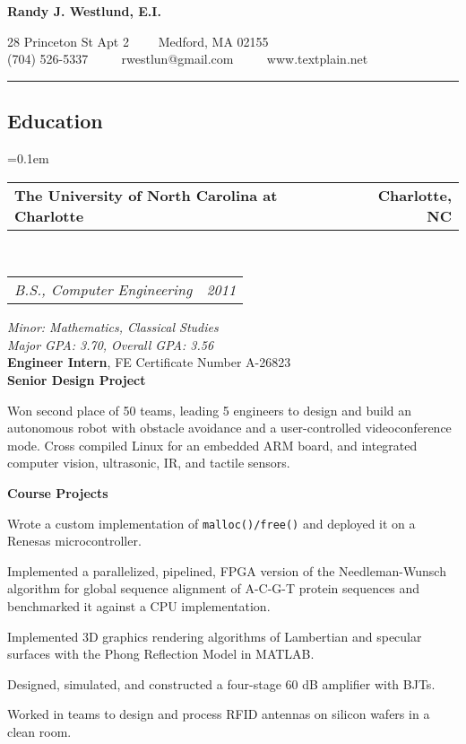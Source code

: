 \documentclass[10pt,letterpaper]{article}
\makeatletter
\newcommand{\headerrow}[2]
{\begin{tabular*}{\linewidth}{l@{\extracolsep{\fill}}r}
	#1 & #2 \\
\end{tabular*}}
\makeatother
\begin{document}
\begin{center}
{\LARGE \textbf{Randy J. Westlund, E.I.}}

28 Princeton St Apt 2 \ \ \textbullet \ \ Medford, MA 02155 \\
(704) 526-5337 \ \ \textbullet
\ \ rwestlun@gmail.com \ \ \textbullet
\ \ www.textplain.net
\end{center}

\hrule
\vspace{-0.4em}
\subsection*{Education}
\begin{itemize*}
	\parskip=0.1em
	\item 
	\headerrow
		{\textbf{The University of North Carolina at Charlotte}}
		{\textbf{Charlotte, NC}}
	\\
	\headerrow
		{\emph{B.S., Computer Engineering}}
		{\emph{2011}}
		\emph{Minor: Mathematics, Classical Studies} \\
        \emph{Major GPA\@: 3.70, Overall GPA\@: 3.56} \\
        \textbf{Engineer Intern},  FE Certificate Number A-26823 \\
        \textbf{Senior Design Project}
        \begin{itemize*}
            \item Won second place of 50 teams, leading 5 engineers to design
                and build an autonomous robot with obstacle avoidance and a
                user-controlled videoconference mode.  Cross compiled Linux for
                an embedded ARM board, and integrated computer vision,
                ultrasonic, IR, and tactile sensors.
        \end{itemize*}
    \textbf{Course Projects}
    \begin{itemize*}
        \item Wrote a custom implementation of \texttt{malloc()/free()} and
            deployed it on a Renesas microcontroller.

        \item Implemented a parallelized, pipelined, FPGA version of the
            Needleman-Wunsch algorithm for global sequence alignment of A-C-G-T
            protein sequences and benchmarked it against a CPU implementation.

        \item Implemented 3D graphics rendering algorithms of Lambertian and
            specular surfaces with the Phong Reflection Model in MATLAB.

        \item Designed, simulated, and constructed a four-stage 60 dB amplifier
            with BJTs.

        \item Worked in teams to design and process RFID antennas on silicon
            wafers in a clean room.
    \end{itemize*}
\end{itemize*}
\end{document}
